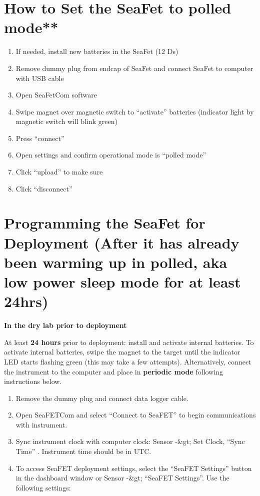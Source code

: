 \documentclass[]{book}
\providecommand{\tightlist}{%
  \setlength{\itemsep}{0pt}\setlength{\parskip}{0pt}}
\begin{document}
\section{How to Set the SeaFet to polled
mode**}\label{how-to-set-the-seafet-to-polled-mode}

\begin{enumerate}
\def\labelenumi{\arabic{enumi}.}
\tightlist
\item
  If needed, install new batteries in the SeaFet (12 Ds)
\item
  Remove dummy plug from endcap of SeaFet and connect SeaFet to computer
  with USB cable
\item
  Open SeaFetCom software
\item
  Swipe magnet over magnetic switch to ``activate'' batteries (indicator
  light by magnetic switch will blink green)
\item
  Press ``connect''
\item
  Open settings and confirm operational mode is ``polled mode''
\item
  Click ``upload'' to make sure
\item
  Click ``disconnect''
\end{enumerate}

\section{Programming the SeaFet for Deployment (After it has already
been warming up in polled, aka low power sleep mode for at least
24hrs)}\label{programming-the-seafet-for-deployment-after-it-has-already-been-warming-up-in-polled-aka-low-power-sleep-mode-for-at-least-24hrs}

\textbf{In the dry lab prior to deployment}

At least \textbf{24 hours} prior to deployment: install and activate
internal batteries. To activate internal batteries, swipe the magnet to
the target until the indicator LED starts flashing green (this may take
a few attempts). Alternatively, connect the instrument to the computer
and place in \textbf{periodic mode} following instructions below.

\begin{enumerate}
\def\labelenumi{\arabic{enumi}.}
\item
  Remove the dummy plug and connect data logger cable.
\item
  Open SeaFETCom and select ``Connect to SeaFET'' to begin
  communications with instrument.
\item
  Sync instrument clock with computer clock: Sensor -\&gt; Set Clock,
  ``Sync Time'' . Instrument time should be in UTC.
\item
  To access SeaFET deployment settings, select the ``SeaFET Settings''
  button in the dashboard window or Sensor -\&gt; ``SeaFET Settings''.
  Use the following settings:
\end{enumerate}
\end{document}
